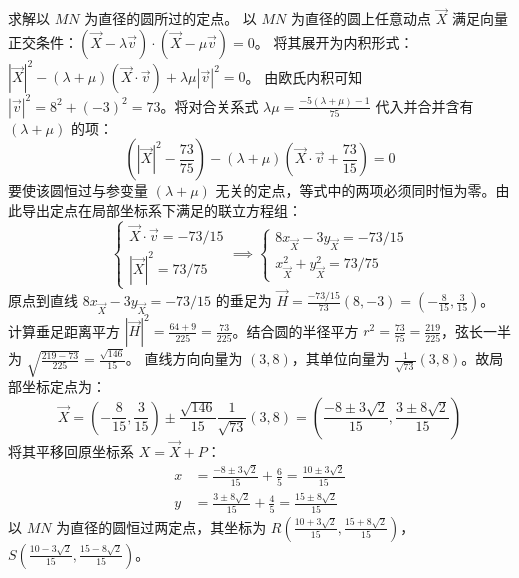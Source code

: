 \begin{solution}
求解以 $MN$ 为直径的圆所过的定点。
以 $MN$ 为直径的圆上任意动点 $\vec{X}$ 满足向量正交条件：$(\vec{X} - \lambda \vec{v}) \cdot (\vec{X} - \mu \vec{v}) = 0$。
将其展开为内积形式：$|\vec{X}|^2 - (\lambda+\mu)(\vec{X} \cdot \vec{v}) + \lambda\mu |\vec{v}|^2 = 0$。
由欧氏内积可知 $|\vec{v}|^2 = 8^2 + (-3)^2 = 73$。将对合关系式 $\lambda\mu = \frac{-5(\lambda+\mu) - 1}{75}$ 代入并合并含有 $(\lambda+\mu)$ 的项：
$$ \left( |\vec{X}|^2 - \frac{73}{75} \right) - (\lambda+\mu) \left( \vec{X} \cdot \vec{v} + \frac{73}{15} \right) = 0 $$
要使该圆恒过与参变量 $(\lambda+\mu)$ 无关的定点，等式中的两项必须同时恒为零。由此导出定点在局部坐标系下满足的联立方程组：
$$ \begin{cases} \vec{X} \cdot \vec{v} = -73/15 \\ |\vec{X}|^2 = 73/75 \end{cases} \implies \begin{cases} 8x_{\vec{X}} - 3y_{\vec{X}} = -73/15 \\ x_{\vec{X}}^2 + y_{\vec{X}}^2 = 73/75 \end{cases} $$
原点到直线 $8x_{\vec{X}} - 3y_{\vec{X}} = -73/15$ 的垂足为 $\vec{H} = \frac{-73/15}{73}(8, -3) = \left(-\frac{8}{15}, \frac{3}{15}\right)$。
计算垂足距离平方 $|\vec{H}|^2 = \frac{64+9}{225} = \frac{73}{225}$。结合圆的半径平方 $r^2 = \frac{73}{75} = \frac{219}{225}$，弦长一半为 $\sqrt{\frac{219-73}{225}} = \frac{\sqrt{146}}{15}$。
直线方向向量为 $(3,8)$，其单位向量为 $\frac{1}{\sqrt{73}}(3,8)$。故局部坐标定点为：
$$ \vec{X} = \left(-\frac{8}{15}, \frac{3}{15}\right) \pm \frac{\sqrt{146}}{15} \frac{1}{\sqrt{73}} (3,8) = \left( \frac{-8 \pm 3\sqrt{2}}{15}, \frac{3 \pm 8\sqrt{2}}{15} \right) $$
将其平移回原坐标系 $X = \vec{X} + P$：
\begin{align*}
x &= \frac{-8 \pm 3\sqrt{2}}{15} + \frac{6}{5} = \frac{10 \pm 3\sqrt{2}}{15} \\
y &= \frac{3 \pm 8\sqrt{2}}{15} + \frac{4}{5} = \frac{15 \pm 8\sqrt{2}}{15}
\end{align*}
以 $MN$ 为直径的圆恒过两定点，其坐标为 $R\left(\frac{10+3\sqrt{2}}{15}, \frac{15+8\sqrt{2}}{15}\right)$， $S\left(\frac{10-3\sqrt{2}}{15}, \frac{15-8\sqrt{2}}{15}\right)$。
\end{solution}

